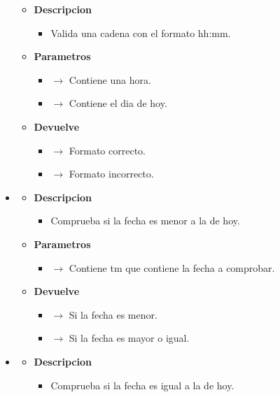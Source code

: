 \begin{itemize}
\begin{itemize}
         \item \textbf{Descripcion}
         \begin{itemize}
 			\item Valida una cadena con el formato hh:mm.
 		\end{itemize}
 		\item \textbf{Parametros}
 		\begin{itemize}
 			\item {} $\rightarrow$ Contiene una hora.
            \item {} $\rightarrow$ Contiene el dia de hoy.
 		\end{itemize}
         \item \textbf{Devuelve}
 		\begin{itemize}
 			\item {} $\rightarrow$ Formato correcto.
             \item {} $\rightarrow$ Formato incorrecto.
 		\end{itemize}
 	\end{itemize}
    \item {}
     \begin{itemize}
         \item \textbf{Descripcion}
         \begin{itemize}
 			\item Comprueba si la fecha es menor a la de hoy.
 		\end{itemize}
 		\item \textbf{Parametros}
 		\begin{itemize}
 			\item {} $\rightarrow$ Contiene tm que contiene la fecha a comprobar.
 		\end{itemize}
         \item \textbf{Devuelve}
 		\begin{itemize}
 			\item {} $\rightarrow$ Si la fecha es menor.
             \item {} $\rightarrow$ Si la fecha es mayor o igual.
 		\end{itemize}
 	\end{itemize}
    \item {}
     \begin{itemize}
         \item \textbf{Descripcion}
         \begin{itemize}
 			\item Comprueba si la fecha es igual a la de hoy.

\end{itemize}
\end{itemize}
\end{itemize}
